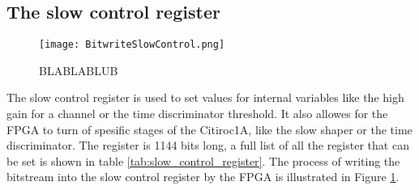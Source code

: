 \subsection{The slow control register}

\begin{figure}
    \centering
    \texttt{[image: BitwriteSlowControl.png]}
    \caption{BLABLABLUB\autocite{datasheetCITIROC}}
    \label{fig:CITIROC1A_writing_bitstream}
\end{figure}
The slow control register is used to set values for internal variables like the high gain for a channel or the time discriminator threshold.
It also allowes for the FPGA to turn of spesific stages of the Citiroc1A, like the slow shaper or the time discriminator.
The register is 1144 bits long, a full list of all the register that can be set is shown in table \ref{tab:slow_control_register}.
\newline
The process of writing the bitstream into the slow control register by the FPGA is illustrated in Figure \ref{fig:CITIROC1A_writing_bitstream}.


